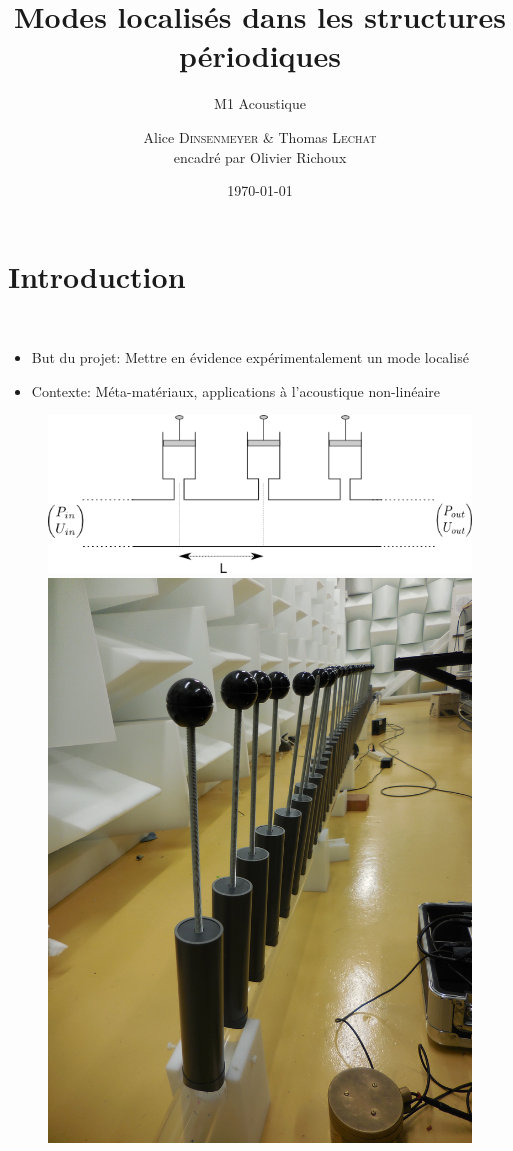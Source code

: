 \documentclass[12pt,notes=show]{beamer} %
\author{Alice \textsc{Dinsenmeyer} \& Thomas \textsc{Lechat} \\ encadré par Olivier Richoux}
\title{ Modes localisés dans les structures périodiques}
\subtitle{M1 Acoustique}
\date{\today}
\begin{document}
\begin{frame}
	\titlepage
\end{frame}
\begin{frame}
\tableofcontents
\end{frame}

\section{Introduction}
\begin{frame}{~}
\insertsectionhead
\begin{itemize}
\item But du projet: Mettre en évidence expérimentalement un mode localisé
\item Contexte: Méta-matériaux, applications à l'acoustique non-linéaire
\end{itemize}
	\centering
	\begin{figure}
		\includegraphics[scale=0.35]{schema_reseau_infini.png}\hfill
		\includegraphics[scale=0.02]{photo.jpg}
	\end{figure}
	

\end{frame}
\end{document}
